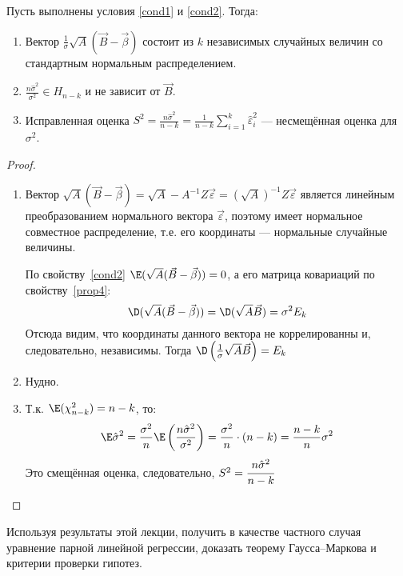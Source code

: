 \begin{theorem}\label{th:основная теорема множественной линейной регрессии}
    Пусть выполнены условия \ref{cond1} и \ref{cond2}. Тогда:
    \begin{enumerate}
        \item Вектор \(\frac{1}{\sigma}\sqrt{A}(\vec{B} - \vec{\beta})\) состоит из \(k\) независимых случайных величин со стандартным нормальным распределением.
        \item \(\frac{n \hat{\sigma}^2}{\sigma^2} \in H_{n - k}\) и не зависит от \(\vec{B}\).
        \item Исправленная оценка \(S^2 = \frac{n \hat{\sigma}^2}{n - k} = \frac{1}{n - k} \sum_{i=1}^{k} \hat{\varepsilon}_i^2\) --- несмещённая оценка для \(\sigma^2\). \label{ОТМЛР3}
    \end{enumerate}
\end{theorem}
\begin{proof}\itemfix
    \begin{enumerate}
        \item Вектор \(\sqrt{A}(\vec{B} - \vec{\beta}) = \sqrt{A} - A^{-1} Z \vec{\varepsilon} = (\sqrt{A})^{-1} Z \vec{\varepsilon}\) является линейным преобразованием нормального вектора \(\vec{\varepsilon}\), поэтому имеет нормальное совместное распределение, т.е. его координаты --- нормальные случайные величины.

              По свойству~\ref{cond2} \(\E(\sqrt{A} (\vec{B} - \vec{\beta})) = 0\), а его матрица ковариаций по свойству~\ref{prop4}:
              \[\D(\sqrt{A} (\vec{B} - \vec{\beta})) = \D (\sqrt{A} \vec{B}) = \sigma^2 E_k\]
              Отсюда видим, что координаты данного вектора не коррелированны и, следовательно, независимы. Тогда \(\D\left(\frac{1}{\sigma}\sqrt{A} \vec{B}\right) = E_k\)
        \item Нудно.
        \item Т.к. \(\E(\chi^2_{n - k}) = n - k\), то:
              \[\E \hat{\sigma}^2 = \frac{\sigma^2}{n} \E \left(\frac{n \hat{\sigma}^2}{\sigma^2}\right) = \frac{\sigma^2}{n} \cdot (n - k) = \frac{n - k}{n}\sigma^2\]
              Это смещённая оценка, следовательно, \(S^2 = \cfrac{n \hat{\sigma}^2}{n - k}\)
    \end{enumerate}
\end{proof}

\begin{exercise}
    Используя результаты этой лекции, получить в качестве частного случая уравнение парной линейной регрессии, доказать теорему Гаусса--Маркова и критерии проверки гипотез.
\end{exercise}
